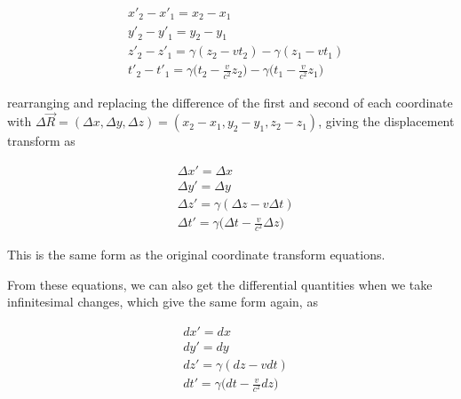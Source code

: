 \begin{equation}
	\begin{aligned}
		 & {x{'}}_2-{x{'}}_1 = x_2-x_1                                                                                         \\
		 & {y{'}}_2-{y{'}}_1 = y_2-y_1                                                                                         \\
		 & z{'}_2-z{'}_1 = {\gamma} ( z_2- {v} {t}_2)-{\gamma} ( z_1- {v} {t}_1)                                               \\
		 & {t{'}}_2-t{'}_1 = {\gamma} \bigg( {t}_2-\frac{v}{{c}^2} z_2 \bigg)-{\gamma} \bigg( {t}_1-\frac{v}{{c}^2} z_1 \bigg)
	\end{aligned}
\end{equation}

rearranging and replacing the difference of the first and second of each coordinate with ${\Delta}{\vec{R}} = ({\Delta}x,{\Delta}y,{\Delta}z) = (x_2-x_1,y_2-y_1,z_2-z_1)$, giving the displacement transform as

\begin{equation}
	\label{eq: interval of Coordinates}
	\begin{aligned}
		 & \Delta x{'} = {\Delta x}                                                   \\
		 & \Delta {y{'}} = {\Delta y}                                                 \\
		 & \Delta {z{'}} = {\gamma} ( {\Delta z}- {v} \Delta t)                       \\
		 & {\Delta t{'}} = {\gamma} \bigg( \Delta t-\frac{v}{{c}^2} {\Delta z} \bigg)
	\end{aligned}
\end{equation}

This is the same form as the original coordinate transform equations.

From these equations, we can also get the differential quantities when we take infinitesimal changes, which give the same form again, as

\begin{equation}
	\label{eq: Infintesmal interval of Coordinates}
	\begin{aligned}
		 & {dx{'}} = {dx}                                        \\
		 & {dy{'}} = {dy}                                        \\
		 & {dz{'}} = {\gamma} (dz- {v}dt)                        \\
		 & {dt{'}} = {\gamma} \bigg(dt-\frac{v}{{c}^2} dz \bigg)
	\end{aligned}
\end{equation}

